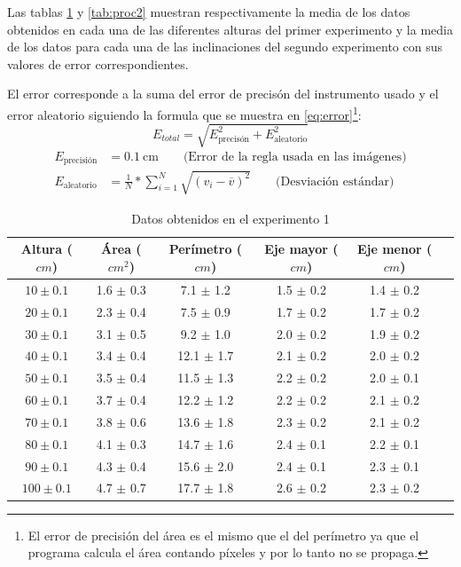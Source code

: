 

Las tablas \ref{tab:proc1} y \ref{tab:proc2} muestran
respectivamente la media de los datos obtenidos en cada una de las diferentes
alturas del primer experimento y la media de los datos para cada una de las
inclinaciones del segundo experimento con sus valores de error
correspondientes.

El error corresponde a la suma del error de precisón del instrumento usado y el
error aleatorio siguiendo la formula que se muestra en
\ref{eq:error}\footnote{El error de precisión del área es el mismo que el del
perímetro ya que el programa calcula el área contando píxeles y por lo tanto no
se propaga.}: 
\begin{equation}
\label{eq:error}
E_{total}=
\sqrt{
E_\text{precisón}^2
+E_\text{aleatorio}^2
} 
\end{equation} 
\begin{align}
    E_\text{precisión}&=0.1\ 
    \text{cm} 
    \qquad 
    \text{(Error de la regla usada en las
imágenes)} \\ 
    E_\text{aleatorio} &= \frac{1}{N}*
    \sum_{i=1}^N
    \sqrt{
    \left(v_i -
\overline{v}
\right)^2} 
\qquad 
\text{
(Desviación 
estándar)
} 
\end{align}


\begin{table}[H] \centering \caption{Datos obtenidos en el experimento 1}
    \label{tab:proc1} \begin{tabular}{cccccc} \toprule Altura ($cm$) & Área
        ($cm^2$) & Perímetro ($cm$) & Eje mayor ($cm$) & Eje menor ($cm$) \\
        \midrule $10\pm0.1$  &   1.6 $\pm$ 0.3 &   7.1 $\pm$ 1.2 &   1.5 $\pm$
        0.2 & 1.4 $\pm$ 0.2 \\ $20\pm0.1$  &   2.3 $\pm$ 0.4 &   7.5 $\pm$ 0.9
            &   1.7 $\pm$ 0.2 & 1.7 $\pm$ 0.2 \\ $30\pm0.1$  &   3.1 $\pm$ 0.5
            &   9.2 $\pm$ 1.0 &   2.0 $\pm$ 0.2 & 1.9 $\pm$ 0.2 \\ $40\pm0.1$
            &   3.4 $\pm$ 0.4 &   12.1    $\pm$ 1.7 &   2.1 $\pm$ 0.2 &   2.0
        $\pm$ 0.2 \\ $50\pm0.1$  &   3.5 $\pm$ 0.4 &   11.5    $\pm$ 1.3 &
        2.2 $\pm$ 0.2 &   2.0 $\pm$ 0.1 \\ $60\pm0.1$  &   3.7 $\pm$ 0.4 &
        12.2    $\pm$ 1.2 &   2.2 $\pm$ 0.2 &   2.1 $\pm$ 0.2 \\ $70\pm0.1$  &
        3.8 $\pm$ 0.6 &   13.6    $\pm$ 1.8 &   2.3 $\pm$ 0.2 &   2.1 $\pm$ 0.2
        \\ $80\pm0.1$  &   4.1 $\pm$ 0.3 &   14.7    $\pm$ 1.6 &   2.4 $\pm$
        0.1 &   2.2 $\pm$ 0.1 \\ $90\pm0.1$  &   4.3 $\pm$ 0.4 &   15.6
        $\pm$ 2.0 &   2.4 $\pm$ 0.1 &   2.3 $\pm$ 0.1 \\ $100\pm 0.1$ &   4.7
        $\pm$ 0.7 &   17.7    $\pm$ 1.8 &   2.6 $\pm$ 0.2 &   2.3 $\pm$ 0.2 \\
    \bottomrule \end{tabular} \end{table}

